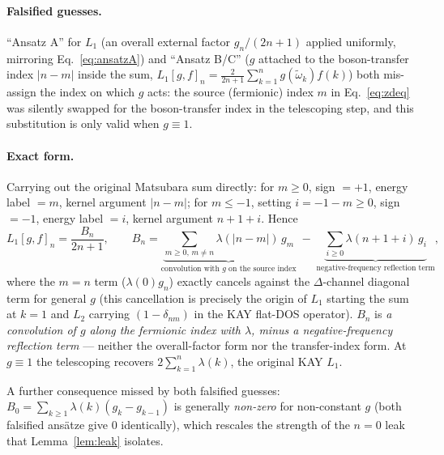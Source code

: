 \documentclass[11pt]{article}
\begin{document}
\paragraph{Falsified guesses.} ``Ansatz A'' for $L_1$ (an overall external
factor $g_n/(2n+1)$ applied uniformly, mirroring Eq.~\eqref{eq:ansatzA}) and
``Ansatz B/C'' ($g$ attached to the boson-transfer index $|n-m|$ inside the
sum, $L_1[g,f]_n=\frac2{2n+1}\sum_{k=1}^ng(\tilde\omega_k)f(k)$) both
mis-assign the index on which $g$ acts: the source (fermionic) index $m$ in
Eq.~\eqref{eq:zdeq} was silently swapped for the boson-transfer index in the
telescoping step, and this substitution is only valid when $g\equiv1$.

\paragraph{Exact form.} Carrying out the original Matsubara sum directly:
for $m\ge0$, sign $=+1$, energy label $=m$, kernel argument $|n-m|$; for
$m\le-1$, setting $i=-1-m\ge0$, sign $=-1$, energy label $=i$, kernel
argument $n+1+i$. Hence
\begin{equation}\label{eq:Bn}
 L_1[g,f]_n = \frac{B_n}{2n+1},
 \qquad
 B_n = \underbrace{\sum_{m\ge0,\,m\neq n}\lambda(|n-m|)\,g_m}_{\text{convolution with }g\text{ on the source index}}
 \;-\;\underbrace{\sum_{i\ge0}\lambda(n+1+i)\,g_i}_{\text{negative-frequency reflection term}},
\end{equation}
where the $m=n$ term ($\lambda(0)g_n$) exactly cancels against the $\Delta$-channel
diagonal term for general $g$ (this cancellation is precisely the origin of
$L_1$ starting the sum at $k=1$ and $L_2$ carrying $(1-\delta_{nm})$ in the
KAY flat-DOS operator). $B_n$ is \emph{a convolution of $g$ along the
fermionic index with $\lambda$, minus a negative-frequency reflection term}
--- neither the overall-factor form nor the transfer-index form. At $g\equiv1$
the telescoping recovers $2\sum_{k=1}^n\lambda(k)$, the original KAY $L_1$.

A further consequence missed by both falsified guesses: $B_0=\sum_{k\ge1}\lambda(k)(g_k-g_{k-1})$
is generally \emph{non-zero} for non-constant $g$ (both falsified ansätze
give $0$ identically), which rescales the strength of the $n=0$ leak that
Lemma~\ref{lem:leak} isolates.
\end{document}
